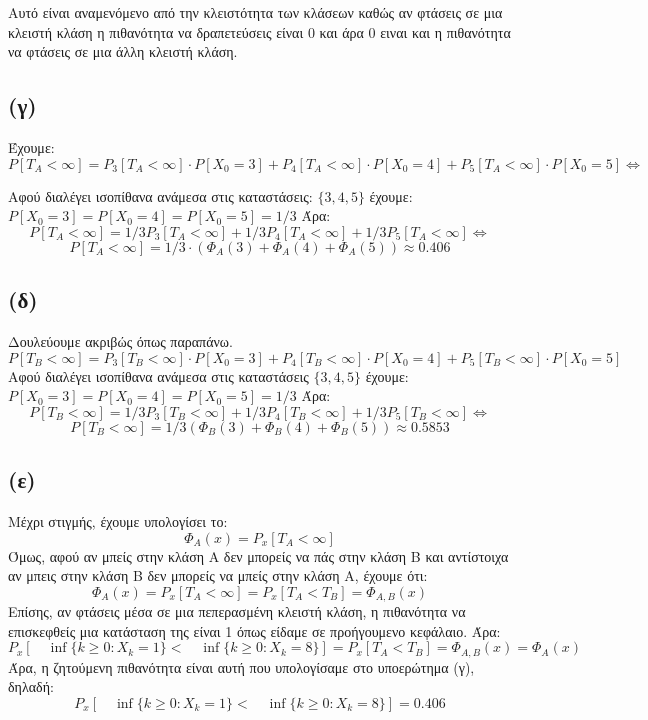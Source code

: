 \documentclass[a4paper,oneside, 11pt]{article}
\begin{document}
Αυτό είναι αναμενόμενο από την κλειστότητα των κλάσεων καθώς αν φτάσεις σε μια κλειστή κλάση η πιθανότητα να δραπετεύσεις είναι 0 και άρα 0 ειναι και η πιθανότητα να φτάσεις σε μια άλλη κλειστή κλάση.
\subsection*{(γ)}
Έχουμε:
$$
P[T_A < \infty] = P_3[T_A < \infty] \cdot P[X_0 = 3]  + P_4[T_A < \infty]\cdot P[X_0 = 4] + P_5[T_A < \infty]\cdot P[X_0 = 5] \iff
$$

Αφού διαλέγει ισοπίθανα ανάμεσα στις καταστάσεις:
$\{3, 4, 5\}$ έχουμε: $P[X_0 = 3] = P[X_0 = 4] = P[X_0 = 5] = 1/3$
\bigbreak 
Άρα:
$$
P[T_A < \infty] = 1/3 P_3[T_A < \infty]  + 1/3P_4[T_A < \infty] + 1/3P_5[T_A < \infty] \iff $$
$$ P[T_A < \infty] = 1/3 \cdot \left( \Phi_A(3) + \Phi_A(4) + \Phi_A(5) \right) \approx 0.406 
$$

\subsection*{(δ)}
Δουλεύουμε ακριβώς όπως παραπάνω.
$$
P[T_B < \infty] = P_3[T_B < \infty] \cdot P[X_0 = 3]  + P_4[T_B < \infty]\cdot P[X_0 = 4] + P_5[T_B < \infty]\cdot P[X_0 = 5]
$$
Αφού διαλέγει ισοπίθανα ανάμεσα στις καταστάσεις 
$\{3, 4, 5\}$ έχουμε: $P[X_0 = 3] = P[X_0 = 4] = P[X_0 = 5] = 1/3$
\bigbreak 
Άρα:
$$
P[T_B < \infty] = 1/3 P_3[T_B < \infty]  + 1/3P_4[T_B < \infty] + 1/3P_5[T_B < \infty] \iff 
$$
$$
P[T_B < \infty] = 1/3 \left( \Phi_B(3) + \Phi_B(4) + \Phi_B(5) \right) \approx 0.5853
$$

\subsection*{(ε)}

Μέχρι στιγμής, έχουμε υπολογίσει το:
$$
\Phi_A(x) = P_x[T_A < \infty]
$$
Όμως, αφού αν μπείς στην κλάση Α δεν μπορείς να πάς στην κλάση Β και αντίστοιχα αν μπεις στην κλάση Β δεν μπορείς να μπείς στην κλάση Α, έχουμε ότι:
$$
\Phi_A(x) = P_x[T_A < \infty] = P_x[T_A < T_B] = \Phi_{A, B}(x)
$$
Επίσης, αν φτάσεις μέσα σε μια πεπερασμένη κλειστή κλάση, η πιθανότητα να επισκεφθείς μια κατάσταση της είναι 1 όπως είδαμε σε προήγουμενο κεφάλαιο.
Άρα:
$$
P_x[ \quad \inf\{k\geq 0: X_k=1\} < \quad \inf\{k \geq 0: X_k=8\}] = P_x[T_A < T_B] = \Phi_{A, B}(x) = \Phi_A(x)
$$
Άρα, η ζητούμενη πιθανότητα είναι αυτή που υπολογίσαμε στο υποερώτημα (γ), δηλαδή:
$$
P_x[ \quad \inf\{k\geq 0: X_k=1\} < \quad \inf\{k \geq 0: X_k=8\}] = 0.406
$$
\end{document}
